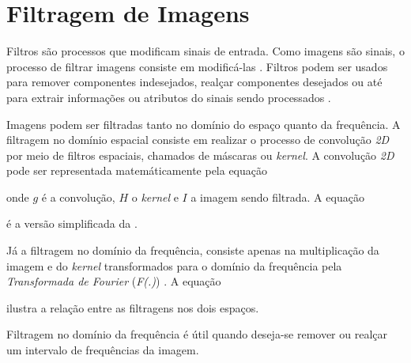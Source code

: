 \section{Filtragem de Imagens} \label{sec:fundamentacao:filtragem}

\par Filtros são processos que modificam sinais de entrada. Como imagens são sinais, o processo de filtrar imagens consiste em modificá-las \cite{gonsalez2006}. Filtros podem ser usados para remover componentes indesejados, realçar componentes desejados ou até para extrair informações ou atributos do sinais sendo processados \cite{loggabor-kovesi}.

\par Imagens podem ser filtradas tanto no domínio do espaço quanto da frequência. A filtragem no domínio espacial consiste em realizar o processo de convolução \textit{2D} por meio de filtros espaciais, chamados de máscaras ou \textit{kernel}\cite{oppenheim2013signals}. A convolução \textit{2D} pode ser representada matemáticamente pela equação


\noindent onde $g$ é a convolução, $H$ o \textit{kernel} e $I$ a imagem sendo filtrada\cite{gonsalez2006}. A equação


\noindent é a versão simplificada da .

\par Já a filtragem no domínio da frequência, consiste apenas na multiplicação da imagem e do \textit{kernel} transformados para o domínio da frequência pela \textit{Transformada de Fourier} (\textit{F(.)}) \cite{gonsalez2006}. A equação


\noindent ilustra a relação entre as filtragens nos dois espaços.

\par Filtragem no domínio da frequência é útil quando deseja-se remover ou realçar um intervalo de frequências da imagem.

